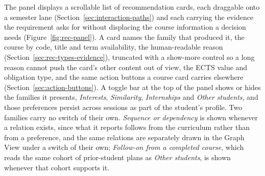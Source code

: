 The panel displays a scrollable list of recommendation cards, each draggable onto a semester lane (Section~\ref{sec:interaction-paths}) and each carrying the evidence the requirement asks for without displacing the course information a decision needs (Figure~\ref{fig:rec-panel}). A card names the family that produced it, the course by code, title and term availability, the human-readable reason (Section~\ref{sec:rec-types-evidence}), truncated with a show-more control so a long reason cannot push the card's other content out of view, the ECTS value and obligation type, and the same action buttons a course card carries elsewhere (Section~\ref{sec:action-buttons}). A toggle bar at the top of the panel shows or hides the families it presents, \emph{Interests}, \emph{Similarity}, \emph{Internships} and \emph{Other students}, and those preferences persist across sessions as part of the student's profile. Two families carry no switch of their own. \emph{Sequence or dependency} is shown whenever a relation exists, since what it reports follows from the curriculum rather than from a preference, and the same relations are separately drawn in the Graph View under a switch of their own; \emph{Follow-on from a completed course}, which reads the same cohort of prior-student plans as \emph{Other students}, is shown whenever that cohort supports it.
